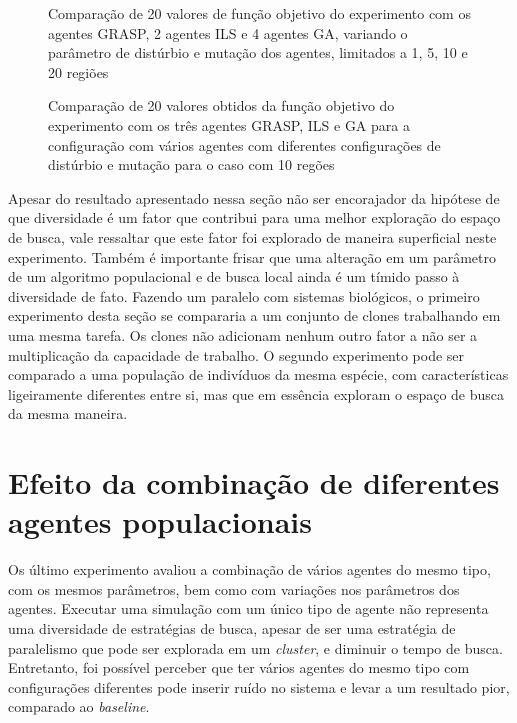 \begin{figure}[ht!]
    \centering
    \caption{Comparação de 20 valores de função objetivo do experimento com os agentes GRASP, 2 agentes ILS e 4 agentes GA, variando o parâmetro de distúrbio e mutação dos agentes, limitados a 1, 5, 10 e 20 regiões}
    
    \label{fig:A02boxplot}
\end{figure}

\begin{figure}[ht!]
    \centering
    \caption{Comparação de 20 valores obtidos da função objetivo do experimento com os três agentes GRASP, ILS e GA para a configuração com vários agentes com diferentes configurações de distúrbio e mutação para o caso com 10 regões}
    
    \label{fig:A0A02boxplot}
\end{figure}

Apesar do resultado apresentado nessa seção não ser encorajador da hipótese de que diversidade é um fator que contribui para uma melhor exploração do espaço de busca, vale ressaltar que este fator foi explorado de maneira superficial neste experimento. Também é importante frisar que uma alteração em um parâmetro de um algoritmo populacional e de busca local ainda é um tímido passo à diversidade de fato. Fazendo um paralelo com sistemas biológicos, o primeiro experimento desta seção se compararia a um conjunto de clones trabalhando em uma mesma tarefa. Os clones não adicionam nenhum outro fator a não ser a multiplicação da capacidade de trabalho. O segundo experimento pode ser comparado a uma população de indivíduos da mesma espécie, com características ligeiramente diferentes entre si, mas que em essência exploram o espaço de busca da mesma maneira. 

\section{Efeito da combinação de diferentes agentes populacionais} 
\label{sec:diversidade}

Os último experimento avaliou a combinação de vários agentes do mesmo tipo, com os mesmos parâmetros, bem como com variações nos parâmetros dos agentes.  Executar  uma simulação com um único tipo de agente não representa uma diversidade de estratégias de busca, apesar de ser uma estratégia de paralelismo que pode ser explorada em um \textit{cluster}, e diminuir o tempo de busca. Entretanto, foi possível perceber que ter vários agentes do mesmo tipo com configurações diferentes pode inserir ruído no sistema e levar a um resultado pior, comparado ao \textit{baseline}. 

